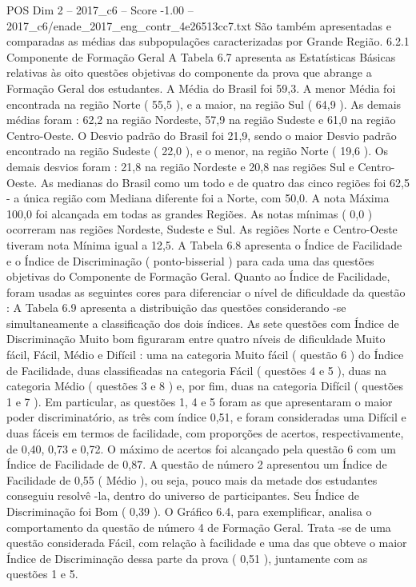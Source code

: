 \begin{textsample}{POS Dim 2 – 2017\_c6 – Score -1.00 – 2017\_c6/enade\_2017\_eng\_contr\_4e26513cc7.txt}
São também apresentadas e comparadas as médias das subpopulações caracterizadas por Grande Região. 6.2.1 Componente de Formação Geral A Tabela 6.7 apresenta as Estatísticas Básicas relativas às oito questões objetivas do componente da prova que abrange a Formação Geral dos estudantes.
A Média do Brasil foi 59,3.
A menor Média foi encontrada na região Norte ( 55,5 ), e a maior, na região Sul ( 64,9 ).
As demais médias foram : 62,2 na região Nordeste, 57,9 na região Sudeste e 61,0 na região Centro-Oeste.
O Desvio padrão do Brasil foi 21,9, sendo o maior Desvio padrão encontrado na região Sudeste ( 22,0 ), e o menor, na região Norte ( 19,6 ).
Os demais desvios foram : 21,8 na região Nordeste e 20,8 nas regiões Sul e Centro-Oeste.
As medianas do Brasil como um todo e de quatro das cinco regiões foi 62,5 - a única região com Mediana diferente foi a Norte, com 50,0.
A nota Máxima 100,0 foi alcançada em todas as grandes Regiões.
As notas mínimas ( 0,0 ) ocorreram nas regiões Nordeste, Sudeste e Sul.
As regiões Norte e Centro-Oeste tiveram nota Mínima igual a 12,5.
A Tabela 6.8 apresenta o Índice de Facilidade e o Índice de Discriminação ( ponto-bisserial ) para cada uma das questões objetivas do Componente de Formação Geral.
Quanto ao Índice de Facilidade, foram usadas as seguintes cores para diferenciar o nível de dificuldade da questão : A Tabela 6.9 apresenta a distribuição das questões considerando -se simultaneamente a classificação dos dois índices.
As sete questões com Índice de Discriminação Muito bom figuraram entre quatro níveis de dificuldade Muito fácil, Fácil, Médio e Difícil : uma na categoria Muito fácil ( questão 6 ) do Índice de Facilidade, duas classificadas na categoria Fácil ( questões 4 e 5 ), duas na categoria Médio ( questões 3 e 8 ) e, por fim, duas na categoria Difícil ( questões 1 e 7 ).
Em particular, as questões 1, 4 e 5 foram as que apresentaram o maior poder discriminatório, as três com índice 0,51, e foram consideradas uma Difícil e duas fáceis em termos de facilidade, com proporções de acertos, respectivamente, de 0,40, 0,73 e 0,72.
O máximo de acertos foi alcançado pela questão 6 com um Índice de Facilidade de 0,87.
A questão de número 2 apresentou um Índice de Facilidade de 0,55 ( Médio ), ou seja, pouco mais da metade dos estudantes conseguiu resolvê -la, dentro do universo de participantes.
Seu Índice de Discriminação foi Bom ( 0,39 ).
O Gráfico 6.4, para exemplificar, analisa o comportamento da questão de número 4 de Formação Geral.
Trata -se de uma questão considerada Fácil, com relação à facilidade e uma das que obteve o maior Índice de Discriminação dessa parte da prova ( 0,51 ), juntamente com as questões 1 e 5.

\end{textsample}

